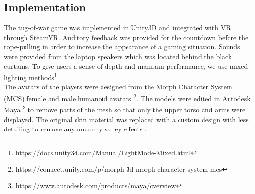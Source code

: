 \subsection{Implementation}
\label{section:implementation}
The tug-of-war game was implemented in Unity3D and integrated with VR through SteamVR. Auditory feedback was provided for the countdown before the rope-pulling in order to increase the appearance of a gaming situation. Sounds were provided from the laptop speakers which was located behind the black curtains. To give users a sense of depth and maintain performance, we use mixed lighting methods\footnote{https://docs.unity3d.com/Manual/LightMode-Mixed.html}.
\\
The avatars of the players were designed from the Morph Character System (MCS) female and male humanoid avatars  \footnote{https://connect.unity.com/p/morph-3d-morph-character-system-mcs}. The models were edited in Autodesk Maya \footnote{https://www.autodesk.com/products/maya/overview} to remove parts of the mesh so that only the upper torso and arms were displayed. The original skin material was replaced with a custom design with less detailing to remove any uncanny valley effects \cite{geller2008overcoming}. 

